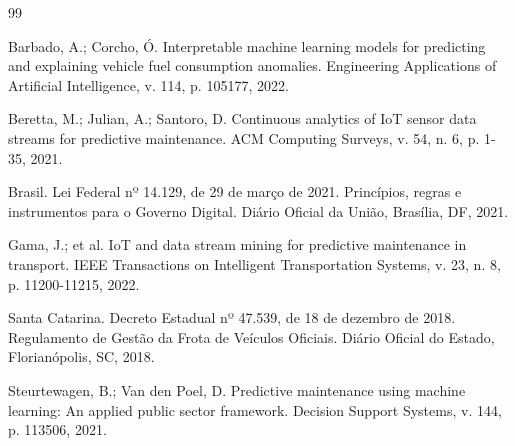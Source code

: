 \documentclass[12pt,a4paper]{article}
\begin{document}
\begin{thebibliography}{99}

 Barbado, A.; Corcho, Ó. Interpretable machine learning models for predicting and explaining vehicle fuel consumption anomalies. Engineering Applications of Artificial Intelligence, v. 114, p. 105177, 2022.

 Beretta, M.; Julian, A.; Santoro, D. Continuous analytics of IoT sensor data streams for predictive maintenance. ACM Computing Surveys, v. 54, n. 6, p. 1-35, 2021.

 Brasil. Lei Federal nº 14.129, de 29 de março de 2021. Princípios, regras e instrumentos para o Governo Digital. Diário Oficial da União, Brasília, DF, 2021.

 Gama, J.; et al. IoT and data stream mining for predictive maintenance in transport. IEEE Transactions on Intelligent Transportation Systems, v. 23, n. 8, p. 11200-11215, 2022.

 Santa Catarina. Decreto Estadual nº 47.539, de 18 de dezembro de 2018. Regulamento de Gestão da Frota de Veículos Oficiais. Diário Oficial do Estado, Florianópolis, SC, 2018.

 Steurtewagen, B.; Van den Poel, D. Predictive maintenance using machine learning: An applied public sector framework. Decision Support Systems, v. 144, p. 113506, 2021.

\end{thebibliography}
\end{document}

